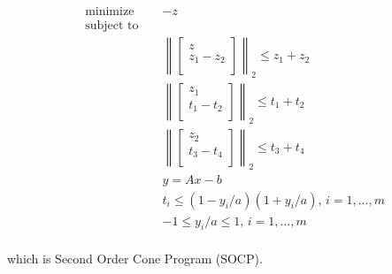 \documentclass{article}
\begin{document}
\begin{align*}
&\text{minimize } && - z \\
&\text{subject to } && \\
& && 
\left\lVert
\begin{bmatrix}
z \\ z_1 - z_2\\
\end{bmatrix}
\right\rVert_2 \leq z_1 + z_2\\
& && \left\lVert
\begin{bmatrix}
z_1 \\ t_1 - t_2\\
\end{bmatrix}
\right\rVert_2 \leq t_1 + t_2\\
& && \left\lVert
\begin{bmatrix}
z_2 \\ t_3 - t_4\\
\end{bmatrix}
\right\rVert_2 \leq t_3 + t_4\\
& && y = A x - b \\
& && t_i \leq (1 - y_i / a)(1 + y_i / a),
\, i = 1, ..., m\\
& && -1 \leq y_i / a \leq 1, \, i = 1, ..., m\\
\end{align*}

which is Second Order Cone Program (SOCP). \\
\end{document}
